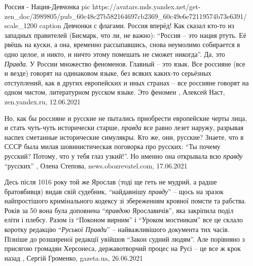 Россия - Нация-Девчонка
\ifcmt
	pic https://avatars.mds.yandex.net/get-zen_doc/3989805/pub_60c48c27b582164697cb2369_60c49e6e72119574b73e6391/scale_1200
  caption Девчонки с флагами. Россия вперёд!
\fi
Как сказал кто-то из западных правителей (Бисмарк, что ли, не важно):
\enquote{Россия -- это нация ртуть. Её рвёшь на куски, а она, временно
рассыпавшись, снова неумолимо собирается в одно целое, и никто, и ничто этому
помешать не сможет никогда}. Да, это \emph{Правда}. У России множество
феноменов. Главный -- это язык.  Все россияне (все и везде) говорят на
одинаковом языке, без всяких каких-то серьёзных отступлений, как в других
европейских и иных странах -- все россияне говорят на одном чистом,
литературном русском языке. Это феномен
, 
Алексей Наст, zen.yandex.ru, 12.06.2021

Но, как бы россияне и русские не пытались приобрести европейские черты лица, и
стать чуть-чуть исторически старше, \emph{правда} все равно лезет наружу, разрывая
наспех сметанные исторические симулякры.  Кто же, они, русские?  Знаете, что в
СССР была милая шовинистическая поговорка про русских: \enquote{Ты почему русский?
Потому, что у тебя глаз узкий!}. Но именно она открывала всю \emph{правду} \enquote{русских}
, 
Олена Степова, news.obozrevatel.com, 17.06.2021


Десь після 1016 року той же Ярослав (тоді ще геть не мудрий, а радше
братовбивця) видав свій судебник, \enquote{найдавнішу \emph{правду}} – щось на зразок
найпростішого кримінального кодексу зі збереженням кровної помсти та рабства.
Років за 50 вона була доповнена \enquote{\emph{правдою} Ярославичів}, яка закріпила поділ
еліти і плебсу. Разом із \enquote{Поконом вирним} і \enquote{Уроком мостникам} все це склало
коротку редакцію \enquote{\emph{Руської Правди}} – найважливішого документа тих часів. Пізніше
до розширеної редакції увійшов \enquote{Закон судний людям}.  Але порівняно з присягою
громадян Херсонеса, державотворчий процес на Русі – це все ж крок назад
, 
Сергій Громенко, gazeta.ua, 26.06.2021

